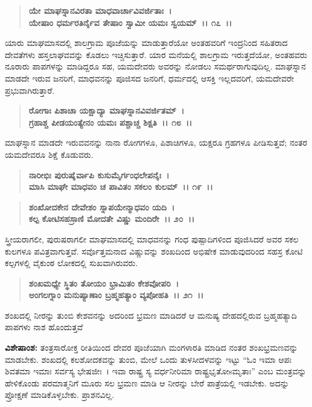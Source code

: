 \begin{verse}
\textbf{ಯೇ ಮಾಘಸ್ನಾನವಿರತಾ ಮಾಧವಾರ್ಚಾವಿವರ್ಜಿತಾಃ~।}\\\textbf{ಯೇಷಾಂ ಧರ್ಮರತಿರ್ನೈವ ತೇಷಾಂ ಸ್ವಾಮೀ ಯಮಃ ಸ್ವಯಮ್~।। ೧೭~।।}
\end{verse}

ಯಾರು ಮಾಘಮಾಸದಲ್ಲಿ ಶಾಲಗ್ರಾಮ ಪೂಜೆಯನ್ನು ಮಾಡುತ್ತಾರೆಯೋ ಅಂತಹವರಿಗೆ ಇಂದ್ರನಿಂದ ಸಹಿತರಾದ ದೇವತೆಗಳು ಹಸ್ತಲಾಘವವನ್ನು ಕೊಡಲು ಇಚ್ಚಿಸುತ್ತಾರೆ. ಯಾರ ಮನೆಯಲ್ಲಿ ಶಾಲಗ್ರಾಮ ಇರುತ್ತದೆಯೋ, ಅಂತಹವರು ನೂರಾರು ಪಾಪಗಳನ್ನು ಮಾಡಿದ್ದರೂ ಸಹ, ಯಮದೇವರು ಅವರನ್ನು ನೋಡಲು ಸಮರ್ಥರಾಗುವುದಿಲ್ಲ. ಮಾಘ\-ಸ್ನಾನ ಮಾಡದೇ ಇರುವ ಜನರಿಗೆ, ಮಾಧವನನ್ನು ಪೂಜಿಸದ ಜನರಿಗೆ, ಧರ್ಮದಲ್ಲಿ ಆಸಕ್ತಿ ಇಲ್ಲದವರಿಗೆ, ಯಮದೇವರೇ ಪ್ರಭುವಾಗಿರುತ್ತಾರೆ.

\begin{verse}
\textbf{ರೋಗಾಃ ಪಿಶಾಚಾ ಯಕ್ಷಾದ್ಯಾ ಮಾಘಸ್ನಾನವಿವರ್ಜಿತಮ್~।}\\\textbf{ಗ್ರಹಾಶ್ಚ ಪೀಡಯಂತ್ಯೇನಂ ಯಮಃ ಪಶ್ಚಾಚ್ಚ ಶಿಕ್ಷತಿ~।। ೧೮~।।}
\end{verse}

ಮಾಘಸ್ನಾನ ಮಾಡದೇ ಇರುವವನನ್ನು ನಾನಾ ರೋಗಗಳೂ, ಪಿಶಾಚಿಗಳೂ, ಯಕ್ಷರೂ ಗ್ರಹಗಳೂ ಪೀಡಿಸುತ್ತವೆ; ನಂತರ ಯಮದೇವರೂ ಶಿಕ್ಷೆ ಕೊಡುವರು.

\begin{verse}
\textbf{ನಾರೀಭಿಃ ಪುರುಷೈರ್ವಾಪಿ ಕುಸುಮೈರ್ಗಂಧಲೇಪನೈಃ~।}\\\textbf{ಮಾಸಿ ಮಾಘೇ ಮಾಧವಂ ಚ ಪಾವಿತಂ ಸಕಲಂ ಕುಲಮ್~।। ೧೯~।। }
\end{verse}

\begin{verse}
\textbf{ಶಂಖೋದಕೇನ ದೇವೇಶಂ ಸ್ನಾಪಯೇನ್ಮಾಧವಂ ಯದಿ~।}\\\textbf{ಕಲ್ಪ ಕೋಟಿಸಹಸ್ರಾಣಿ ಮೋದತೇ ವಿಷ್ಣು ಮಂದಿರೇ~।। ೨೦~।।}
\end{verse}

ಸ್ತ್ರೀಯರಾಗಲೀ, ಪುರುಷರಾಗಲೀ ಮಾಘಮಾಸದಲ್ಲಿ ಮಾಧವನನ್ನು ಗಂಧ ಪುಷ್ಪಾದಿಗಳಿಂದ ಪೂಜಿಸಿದರೆ ಅವರ ಸಕಲ ಕುಲಗಳೂ ಪವಿತ್ರವಾಗುತ್ತವೆ. ಸರ್ವೊತ್ತಮನಾದ ವಿಷ್ಣುವನ್ನು ಶಂಖದಿಂದ ಅಭಿಷೇಕ ಮಾಡುವುದರಿಂದ ಸಹಸ್ರ ಕೋಟಿ ಕಲ್ಪಗಳಲ್ಲಿ ವೈಕುಂಠ ಲೋಕದಲ್ಲಿ ಸುಖವಾಗಿರುವರು.

\begin{verse}
\textbf{ಶಂಖಮಧ್ಯೇ ಸ್ಥಿತಂ ತೋಯಂ ಭ್ರಾಮಿತಂ ಕೇಶವೋಪರಿ~।}\\\textbf{ಅಂಗಲಗ್ನಾಂ ಮನುಷ್ಯಾಣಾಂ ಬ್ರಹ್ಮಹತ್ಯಾಂ ವ್ಯಪೋಹತಿ~।। ೨೧~।।}
\end{verse}

ಶಂಖದಲ್ಲಿ ನೀರನ್ನು ತುಂಬಿ ಕೇಶವನನ್ನು ಅದರಿಂದ ಭ್ರಮಣ ಮಾಡಿದರೆ ಆ ಮನುಷ್ಯ ದೇಹದಲ್ಲಿರುವ ಬ್ರಹ್ಮಹತ್ಯಾದಿ ಪಾಪಗಳು ನಾಶ ಹೊಂದುತ್ತವೆ

\begin{myquote}
\textbf{ವಿಶೇಷಾಂಶ:} ತಂತ್ರಸಾರೋಕ್ತ ರೀತಿಯಿಂದ ದೇವರ ಪೂಜೆಯಾಗಿ ಮಂಗಳಾರತಿ ಮಾಡಿದ ನಂತರ ಶಂಖಭ್ರಮಣವನ್ನು ಮಾಡಬೇಕು. ಶಂಖದಲ್ಲಿ ಕಲಶೋದಕವನ್ನು ತುಂಬಿ, ಮೇಲೆ ಒಂದು ತುಳಸೀದಳವನ್ನು ಇಟ್ಟು “ಓಂ ಇಮಾ ಆಪಃ ಶಿವತಮಾ ಇಮಾಃ ಸರ್ವಸ್ಯ ಭೇಷಜೀಃ~। ಇವಾ ರಾಷ್ಟ್ರ ಸ್ಯ ವರ್ಧನೀರಿಮಾ ರಾಷ್ಟ್ರಭೃತೋsಮೃತಾಃ” ಎಂಬ ಮಂತ್ರವನ್ನು ಹೇಳಿಕೊಂಡು ಪರಮಾತ್ಮನಿಗೆ ಮೂರು ಸಲ ಭ್ರಮಣ ಮಾಡಿ ಆ ನೀರನ್ನು ಬೇರೆ ಪಾತ್ರೆಯಲ್ಲಿ ಇಡಬೇಕು. ಅದನ್ನು ಪ್ರೋಕ್ಷಣೆ ಮಾಡಿಕೊಳ್ಳಬೇಕು. ಪ್ರಾಶನವಿಲ್ಲ.
\end{myquote}

